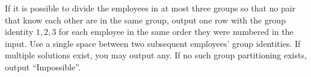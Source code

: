 
If it is possible to divide the employees in at most three groups so that no pair that know each other are in the same group, output one row with the group identity $1,2,3$ for each employee in the same order they were numbered in the input. Use a single space between two subsequent employees' group identities. If multiple solutions exist, you may output any. If no such group partitioning exists, output ``Impossible''.

